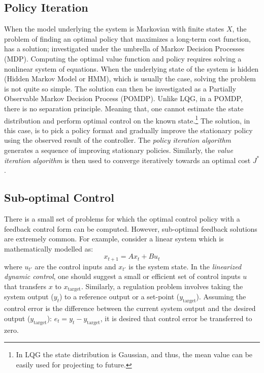 \subsection{Policy Iteration}  
When the model underlying the system is Markovian with finite states $X$, the problem of finding an optimal policy that maximizes a long-term cost function, has a solution; investigated under the umbrella of Markov Decision Processes (MDP). 
Computing the optimal value function and policy requires solving a nonlinear system of equations. When the underlying state of the system is hidden (Hidden Markov Model or HMM), which is usually the case, solving the problem is not quite so simple. The solution can then be investigated as a Partially Observable Markov Decision Process (POMDP). Unlike LQG, in a POMDP, there is no separation principle. Meaning that, one cannot estimate the state distribution and perform optimal control on the known state.\footnote{In LQG the state distribution is Gaussian, and thus, the mean value can be easily used for projecting to future.}
 The solution, in this case, is to pick a policy format and gradually improve the stationary policy using the observed result of the controller. The \textit{policy iteration algorithm} generates a sequence of improving stationary policies. Similarly, the \textit{value iteration algorithm} is then used to converge iteratively towards an optimal cost $J^*$. 
 
 \subsection{Sub-optimal Control}
 There is a small set of problems for which the optimal control policy with a feedback control form can be computed.  However, sub-optimal feedback solutions are extremely common. 
  For example, consider a linear system which is mathematically modelled as: 
  \[ x_{t + 1} = Ax_{t} + Bu_{t} \] 
  where $u_{t'}$ are the control inputs and $x_{t'}$ is the system state. 
  In the \textit{linearized dynamic control}, one should suggest a small or efficient set of control inputs $u$ that transfers $x$ to $x_\text{target}$. %
 Similarly, a regulation problem involves taking the system output ($y_t$) to a reference output or a set-point ($y_\text{target}$). Assuming the control error is the difference between the current system output and the desired output ($y_\text{target}$): $e_t=y_t-y_\text{target}$, it is desired that control error be transferred to zero.
        
